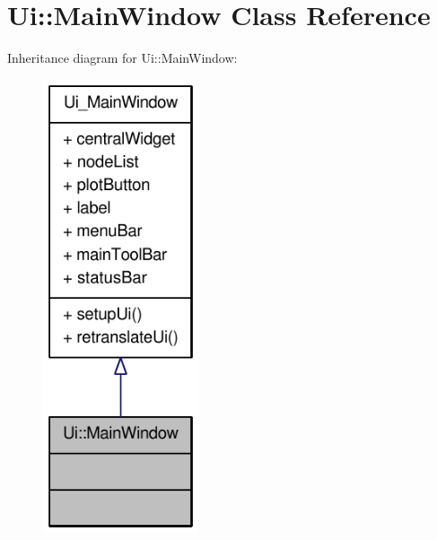 \hypertarget{classUi_1_1MainWindow}{
\section{Ui::MainWindow Class Reference}
\label{classUi_1_1MainWindow}
}


Inheritance diagram for Ui::MainWindow:\nopagebreak
\begin{figure}[H]
\begin{center}
\leavevmode
\includegraphics[width=130pt]{classUi_1_1MainWindow__inherit__graph}
\end{center}
\end{figure}


